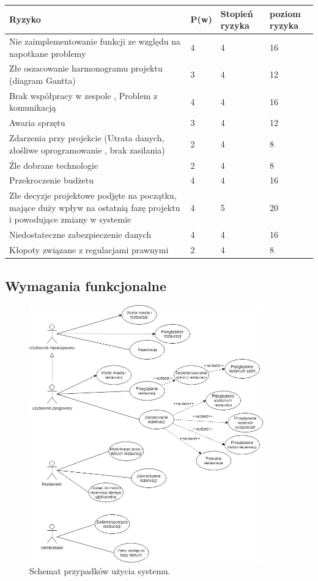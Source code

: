 \documentclass{article}
\begin{document}
\begin{center}
	\begin{tabular}{|p{4cm}|l|l|l|}
		\hline
		Ryzyko & P(w)  & Stopień ryzyka & poziom ryzyka \\ \hline
		Nie zaimplementowanie funkcji ze względu na napotkane problemy & 4 & 4 & 16 \\ \hline
		Złe oszacowanie harmonogramu projektu (diagram Gantta)  & 3 & 4 & 12 \\ \hline
		Brak współpracy w zespole , Problem z komunikacją & 4 & 4 & 16 \\ \hline
		Awaria sprzętu & 3 & 4 & 12 \\ \hline
		Zdarzenia przy projekcie (Utrata danych, złośliwe oprogramowanie , brak zasilania) & 2 & 4 & 8 \\ \hline
		Źle dobrane technologie & 2 & 4 & 8 \\ \hline
		Przekroczenie budżetu & 4 & 4 & 16 \\ \hline
		Złe decyzje projektowe podjęte na początku, mające duży wpływ na ostatnią fazę projektu i powodujące zmiany w systemie & 4 & 5 & 20 \\ \hline
		Niedostateczne zabezpieczenie danych & 4 & 4 & 16 \\ \hline
		Kłopoty związane z regulacjami prawnymi & 2 & 4 & 8 \\ \hline
\end{tabular}
\end{center}

\newpage
\subsection{Wymagania funkcjonalne}

\begin{figure}[H]
\centering
	\includegraphics[width=0.90\textwidth]{use_case.jpg}
	\caption{Schemat przypadków użycia systemu.}
\end{figure}
\end{document}
